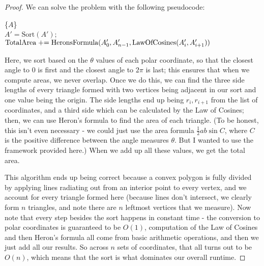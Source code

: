 \documentclass[11pt]{article}
\begin{document}
\begin{enumerate}
\begin{enumerate}
\begin{proof}
We can solve the problem with the following pseudocode:

\begin{algorithm}[H]
 \{$A$\}\\
$A' = \text{Sort}(A')$; \\
$\text{TotalArea} \mathrel{+}= \text{HeronsFormula}(A'_0, A'_{n - 1}, \text{LawOfCosines}(A'_i, A'_{i + 1}))$ \\
\end{algorithm}

Here, we sort based on the $\theta$ values of each polar coordinate, so that the closest angle to $0$ is first and the closest angle to $2\pi$ is last; this ensures that when we compute areas, we never overlap. Once we do this, we can find the three side lengths of every triangle formed with two vertices being adjacent in our sort and one value being the origin. The side lengths end up being $r_i, r_{i + 1}$ from the list of coordinates, and a third side which can be calculated by the Law of Cosines; then, we can use Heron's formula to find the area of each triangle. (To be honest, this isn't even necessary - we could just use the area formula $\frac{1}{2} ab \sin C$, where $C$ is the positive difference between the angle measures $\theta$. But I wanted to use the framework provided here.) When we add up all these values, we get the total area.

This algorithm ends up being correct because a convex polygon is fully divided by applying lines radiating out from an interior point to every vertex, and we account for every triangle formed here (because lines don't intersect, we clearly form $n$ triangles, and note there are $n$ leftmost vertices that we measure). Now note that every step besides the sort happens in constant time - the conversion to polar coordinates is guaranteed to be $O(1)$, computation of the Law of Cosines and then Heron's formula all come from basic arithmetic operations, and then we just add all our results. So across $n$ sets of coordinates, that all turns out to be $O(n)$, which means that the sort is what dominates our overall runtime.
\end{proof}
        

\end{enumerate}
\end{enumerate}
\end{document}
